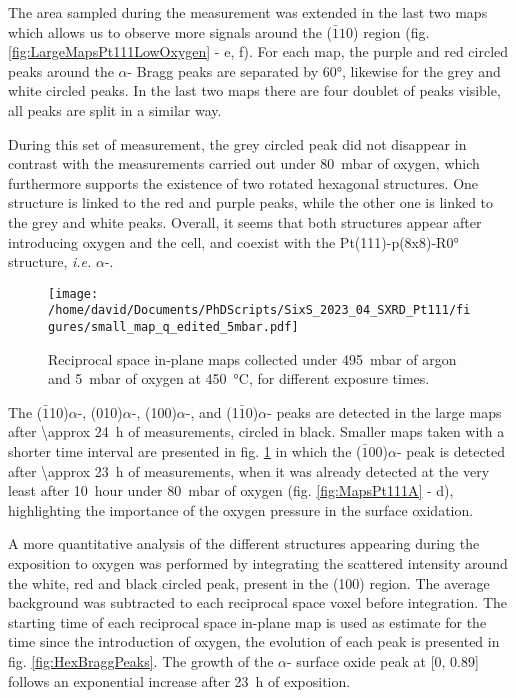 The area sampled during the measurement was extended in the last two maps which allows us to observe more signals around the ($\bar{1}10$) region (fig. \ref{fig:LargeMapsPt111LowOxygen} - e, f).
For each map, the purple and red circled peaks around the $\alpha$- Bragg peaks are separated by \ang{60}, likewise for the grey and white circled peaks.
In the last two maps there are four doublet of peaks visible, all peaks are split in a similar way.

During this set of measurement, the grey circled peak did not disappear in contrast with the measurements carried out under \qty{80}{\milli\bar} of oxygen, which furthermore supports the existence of two rotated hexagonal structures.
One structure is linked to the red and purple peaks, while the other one is linked to the grey and white peaks.
Overall, it seems that both structures appear after introducing oxygen and the cell, and coexist with the Pt(111)-p(8x8)-R\ang{0} structure, \textit{i.e.} $\alpha$-.

\begin{figure}[!htb]
    \centering
    \texttt{[image: /home/david/Documents/PhDScripts/SixS\_2023\_04\_SXRD\_Pt111/figures/small\_map\_q\_edited\_5mbar.pdf]}
    \caption{
        Reciprocal space in-plane maps collected under \qty{495}{\milli\bar} of argon and \qty{5}{\milli\bar} of oxygen at \qty{450}{\degreeCelsius}, for different exposure times.
    }
    \label{fig:SmallMapsPt111LowOxygen}
\end{figure}

The ($\bar{1}$10)$\alpha$-, (010)$\alpha$-, (100)$\alpha$-, and (1$\bar{1}$0)$\alpha$- peaks are detected in the large maps after \qty{\approx 24}{\hour} of measurements, circled in black.
Smaller maps taken with a shorter time interval are presented in fig. \ref{fig:SmallMapsPt111LowOxygen} in which the ($\bar{1}0$0)$\alpha$- peak is detected after \qty{\approx 23}{\hour} of measurements, when it was already detected at the very least after \qty{10}{hour} under \qty{80}{\milli\bar} of oxygen (fig. \ref{fig:MapsPt111A} - d), highlighting the importance of the oxygen pressure in the surface oxidation.

A more quantitative analysis of the different structures appearing during the exposition to oxygen was performed by integrating the scattered intensity around the white, red and black circled peak, present in the (100) region.
The average background was subtracted to each reciprocal space voxel before integration.
The starting time of each reciprocal space in-plane map is used as estimate for the time since the introduction of oxygen, the evolution of each peak is presented in fig. \ref{fig:HexBraggPeaks}.
The growth of the $\alpha$- surface oxide peak at [0, 0.89] follows an exponential increase after \qty{23}{\hour} of exposition.

